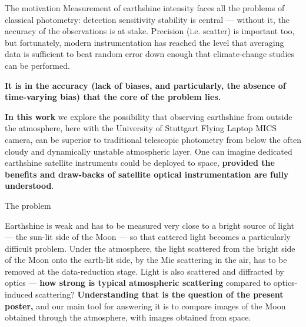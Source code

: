 \documentclass[final,hyperref={pdfpagelabels=false}]{beamer}
\begin{document}
\begin{frame}[t]
\begin{columns}[t]
\begin{column}{.23\textwidth}
\begin{block}{The motivation}
Measurement of earthshine intensity faces all the problems of classical photometry: detection sensitivity stability is central --- without it, the accuracy of the observations is at stake. Precision (i.e. scatter) is important too, but fortunately, modern instrumentation has reached the level that averaging data is sufficient to beat random error down enough that climate-change studies can be performed.

\textbf{It is in the accuracy (lack of biases, and particularly, the absence of time-varying bias) that the core of the problem lies.}

\textbf{In this work} we explore the possibility that observing earthshine from outside the atmosphere, here with the University of Stuttgart Flying Laptop MICS camera, can be superior to traditional telescopic photometry from below the often cloudy and dynamically unstable atmospheric layer. One can imagine dedicated earthshine satellite instruments could be deployed to space, \textbf{provided the benefits and draw-backs of satellite optical instrumentation are fully understood}.

\end{block}


            
\begin{block}{The problem}
 
Earthshine is weak and has to be measured very close to a bright source of light --- the sun-lit side of the Moon --- so that cattered light becomes a particularly difficult problem. Under the atmosphere, the light scattered from the bright side of the Moon onto the earth-lit side, by the Mie scattering in the air, has to be removed at the data-reduction stage. Light is also scattered and diffracted by optics --- \textbf{how strong is typical atmospheric scattering} compared to optics-induced scattering? \textbf{Understanding that is the question of the present poster,} and our main tool for answering it is to compare images of the Moon obtained through the atmosphere, with images obtained  from space.
\end{block}


\end{column}
\end{columns}
\end{frame}
\end{document}
